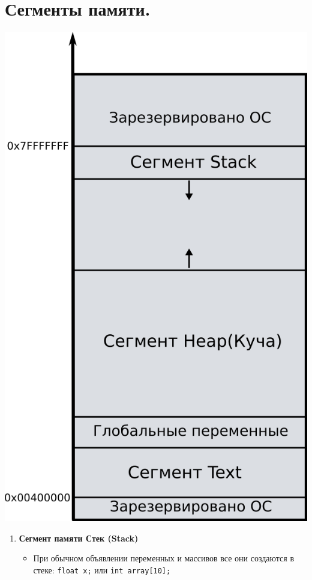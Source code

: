 \documentclass{article}
\begin{document}
\section*{Сегменты памяти.}
\begin{multicols}{2}
\begin{center}
\includegraphics[scale=1.7]{../images/memory_layout.png}
\end{center}
\begin{enumerate}
\item \textbf{Сегмент памяти Стек (Stack)} \\
\begin{itemize}
\item При обычном объявлении переменных и массивов все они создаются в стеке: \texttt{float x;} или \texttt{int array[10];}

\end{itemize}
\end{enumerate}
\end{multicols}
\end{document}
